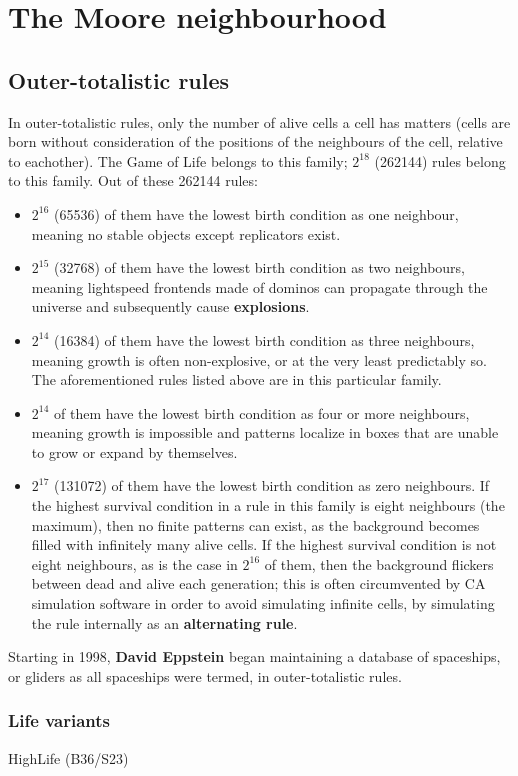 \documentclass[
	11pt, %
	fleqn, %
	a4paper, %
]{LegrandOrangeBook}
\begin{document}
\chapter{The Moore neighbourhood}
\section{Outer-totalistic rules}
In outer-totalistic rules, only the number of alive cells a cell has matters (cells are born without consideration of the positions of the neighbours of the cell, relative to eachother). The Game of Life belongs to this family; $2^{18}$ (262144) rules belong to this family. Out of these 262144 rules:
\begin{itemize}
	\item $2^{16}$ (65536) of them have the lowest birth condition as one neighbour, meaning no stable objects except replicators exist.
	\item $2^{15}$ (32768) of them have the lowest birth condition as two neighbours, meaning lightspeed frontends made of dominos can propagate through the universe and subsequently cause \textbf{explosions}.
	\item $2^{14}$ (16384) of them have the lowest birth condition as three neighbours, meaning growth is often non-explosive, or at the very least predictably so. The aforementioned rules listed above are in this particular family.
	\item $2^{14}$ of them have the lowest birth condition as four or more neighbours, meaning growth is impossible and patterns localize in boxes that are unable to grow or expand by themselves.
	\item $2^{17}$ (131072) of them have the lowest birth condition as zero neighbours. If the highest survival condition in a rule in this family is eight neighbours (the maximum), then no finite patterns can exist, as the background becomes filled with infinitely many alive cells. If the highest survival condition is not eight neighbours, as is the case in $2^{16}$ of them, then the background flickers between dead and alive each generation; this is often circumvented by CA simulation software in order to avoid simulating infinite cells, by simulating the rule internally as an \textbf{alternating rule}.
\end{itemize} 
Starting in 1998, \textbf{David Eppstein} began maintaining a database of spaceships, or gliders as all spaceships were termed, in outer-totalistic rules.
\subsection{Life variants}
HighLife (B36/S23)
\end{document}
